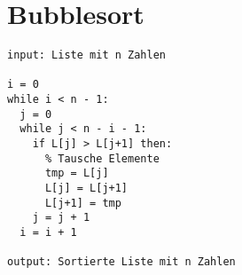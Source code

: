 \section{Bubblesort}

\begin{lstlisting}[language={pseudocode}, caption={Bubblesort}, label={lst-algo-bubblesort}]
input: Liste mit n Zahlen

i = 0
while i < n - 1:
  j = 0
  while j < n - i - 1:
    if L[j] > L[j+1] then:
      % Tausche Elemente
      tmp = L[j]
      L[j] = L[j+1]
      L[j+1] = tmp
    j = j + 1
  i = i + 1
  
output: Sortierte Liste mit n Zahlen
\end{lstlisting}